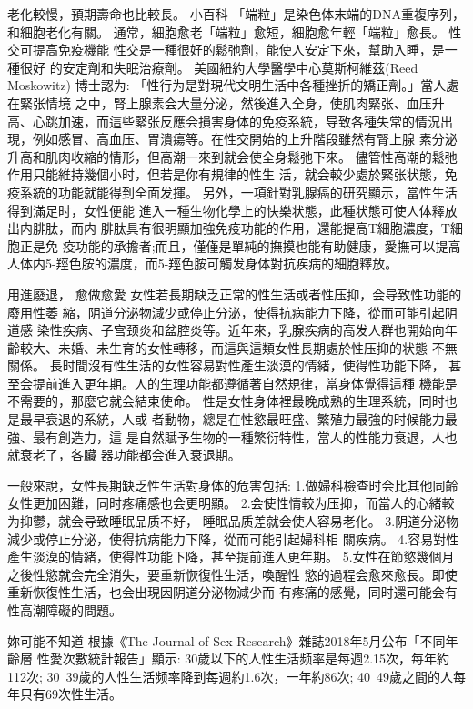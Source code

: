 \documentclass[12pt,UTF8]{ctexbook}
\begin{document}
老化較慢，預期壽命也比較長。
小百科
「端粒」是染色体末端的DNA重複序列，和細胞老化有關。
通常，細胞愈老「端粒」愈短，細胞愈年輕「端粒」愈長。
性交可提高免疫機能
性交是一種很好的鬆弛劑，能使人安定下來，幫助入睡，是一種很好
的安定劑和失眠治療劑。
美國紐約大學醫學中心莫斯柯維茲(Reed Moskowitz) 博士認为:
「性行为是對現代文明生活中各種挫折的矯正劑。」當人處在緊张情境
之中，腎上腺素会大量分泌，然後進入全身，使肌肉緊张、血压升高、心跳加速，而這些緊张反應会損害身体的免疫系統，导致各種失常的情況出
現，例如感冒、高血压、胃潰瘍等。在性交開始的上升階段雖然有腎上腺
素分泌升高和肌肉收縮的情形，但高潮一來到就会使全身鬆弛下來。
儘管性高潮的鬆弛作用只能維持幾個小时，但若是你有規律的性生
活，就会較少處於緊张状態，免疫系統的功能就能得到全面发揮。
另外，一項針對乳腺癌的研究顯示，當性生活得到滿足时，女性便能
進入一種生物化學上的快樂状態，此種状態可使人体釋放出内腓肽，而内
腓肽具有很明顯加強免疫功能的作用，還能提高T細胞濃度，T細胞正是免
疫功能的承擔者;而且，僅僅是單純的撫摸也能有助健康，愛撫可以提高
人体内5-羥色胺的濃度，而5-羥色胺可觸发身体對抗疾病的細胞釋放。

用進廢退，
愈做愈愛
女性若長期缺乏正常的性生活或者性压抑，会导致性功能的廢用性萎
縮，阴道分泌物減少或停止分泌，使得抗病能力下降，從而可能引起阴道感
染性疾病、子宫颈炎和盆腔炎等。近年來，乳腺疾病的高发人群也開始向年
齡較大、未婚、未生育的女性轉移，而這與這類女性長期處於性压抑的状態
不無關係。
長时間沒有性生活的女性容易對性產生淡漠的情緒，使得性功能下降，
甚至会提前進入更年期。人的生理功能都遵循著自然規律，當身体覺得這種
機能是不需要的，那麼它就会結束使命。
性是女性身体裡最晚成熟的生理系統，同时也是最早衰退的系統，人或
者動物，總是在性慾最旺盛、繁殖力最強的时候能力最強、最有創造力，這
是自然賦予生物的一種繁衍特性，當人的性能力衰退，人也就衰老了，各臟
器功能都会進入衰退期。

一般來說，女性長期缺乏性生活對身体的危害包括:
1.做婦科檢查时会比其他同齡女性更加困難，同时疼痛感也会更明顯。
2.会使性情較为压抑，而當人的心緒較为抑鬱，就会导致睡眠品质不好，
睡眠品质差就会使人容易老化。
3.阴道分泌物減少或停止分泌，使得抗病能力下降，從而可能引起婦科相
關疾病。
4.容易對性產生淡漠的情緒，使得性功能下降，甚至提前進入更年期。
5.女性在節慾幾個月之後性慾就会完全消失，要重新恢復性生活，喚醒性
慾的過程会愈來愈長。即使重新恢復性生活，也会出現因阴道分泌物減少而
有疼痛的感覺，同时還可能会有性高潮障礙的問題。

妳可能不知道
根據《The Journal of Sex Research》雜誌2018年5月公布「不同年齡層
性愛次數統計報告」顯示:
30歲以下的人性生活频率是每週2.15次，每年約112次;
30~39歲的人性生活频率降到每週約1.6次，一年約86次;
40~49歲之間的人每年只有69次性生活。
\end{document}
